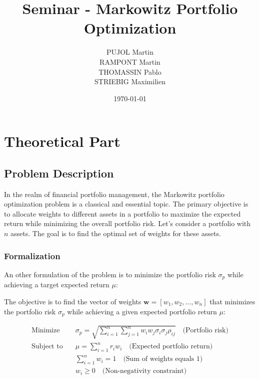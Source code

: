 \documentclass[12pt]{article}
\title{Seminar - Markowitz Portfolio Optimization}
\author{PUJOL Martin \\ RAMPONT Martin \\ THOMASSIN Pablo \\ STRIEBIG Maximilien}
\date{\today}
\begin{document}
\maketitle

\section*{Theoretical Part}

\subsection*{Problem Description}

In the realm of financial portfolio management, the Markowitz portfolio optimization problem is a classical and essential topic. The primary objective is to allocate weights to different assets in a portfolio to maximize the expected return while minimizing the overall portfolio risk. Let's consider a portfolio with $n$ assets. The goal is to find the optimal set of weights for these assets.

\subsubsection*{Formalization}

An other formulation of the problem is to minimize the portfolio risk $\sigma_p$ while achieving a target expected return $\mu$:

The objective is to find the vector of weights $\mathbf{w} = [w_1, w_2, \ldots, w_n]$ that minimizes the portfolio risk $\sigma_p$ while achieving a given expected portfolio return $\mu$:

\begin{equation}
    \begin{aligned}
        \text{Minimize} \quad   & \sigma_p = \sqrt{\sum_{i=1}^{n}\sum_{j=1}^{n} w_i w_j \sigma_i \sigma_j \rho_{ij}} \quad \text{(Portfolio risk)} \\
        \text{Subject to} \quad & \mu = \sum_{i=1}^{n} r_i w_i \quad \text{(Expected portfolio return)}                                             \\
                                & \sum_{i=1}^{n} w_i = 1 \quad \text{(Sum of weights equals 1)}                                                        \\
                                & w_i \geq 0 \quad \text{(Non-negativity constraint)}
    \end{aligned}
\end{equation}
\end{document}

